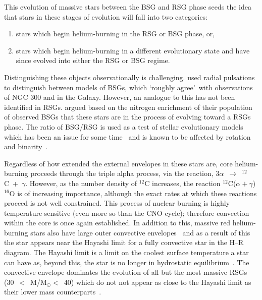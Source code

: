 This evolution of massive stars between the BSG and RSG phase seeds the idea that stars in these stages of evolution will fall into two categories:

\begin{enumerate}
    \item stars which begin helium-burning in the RSG or BSG phase, or,
    \item stars which begin helium-burning in a different evolutionary state and have since evolved into either the RSG or BSG regime.
\end{enumerate}

Distinguishing these objects observationally is challenging.
\cite{Saio13} used radial pulsations to distinguish between models of BSGs, which \textquoteleft roughly agree\textquoteright ~with observations of NGC 300 and in the Galaxy.
However, an analogue to this has not been identified in RSGs.
\cite{2012A&A...542A..79C} argued based on the nitrogen enrichment of their population of observed BSGs that these stars are in the process of evolving toward a RSGs phase.
The ratio of BSG/RSG is used as a test of stellar evolutionary models which has been an issue for some time~\citep{1995A&A...295..685L} and is known to be affected by rotation~\citep{2001A&A...373..555M,2012A&A...537A.146E} and binarity~\citep{2008MNRAS.384.1109E}.


Regardless of how extended the external envelopes in these stars are, core helium-burning proceeds through the triple alpha process, via the reaction, 3$\alpha$~$\rightarrow$~$^{12}$C~+~$\gamma$.
However, as the number density of $^{12}$C increases, the reaction $^{12}$C($\alpha+\gamma$)$^{16}$O is of increasing importance, although the exact rates at which these reactions proceed is not well constrained.
This process of nuclear burning is highly temperature sensitive (even more so than the CNO cycle); therefore convection within the core is once again established.
In addition to this, massive red helium-burning stars also have large outer convective envelopes~\citep{2012sse..book.....K} and as a result of this the star appears near the Hayashi limit for a fully convective star in the H--R diagram.
The Hayashi limit is a limit on the coolest surface temperature a star can have as, beyond this, the star is no longer in hydrostatic equilibrium~\citep{1961PASJ...13..442H}.
The convective envelope dominates the evolution of all but the most massive RSGs (30~$<$~M/M$_{\odot}<$~40) which do not not appear as close to the Hayashi limit as their lower mass counterparts~\citep[see Figure~1 in][]{Saio13}.

